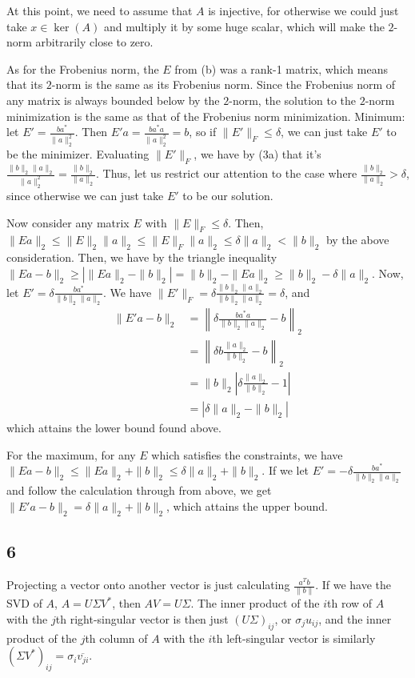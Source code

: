 \documentclass{article}
\newcommand{\conj}{\overline}
\begin{document}
At this point, we need to assume that $A$ is injective, for otherwise we could just take $x\in\ker(A)$ and multiply it by some huge scalar, which will make the $2$-norm arbitrarily close to zero. 

As for the Frobenius norm, the $E$ from (b) was a rank-1 matrix, which means that its $2$-norm is the same as its Frobenius norm. Since the Frobenius norm of any matrix is always bounded below by the $2$-norm, the solution to the $2$-norm minimization is the same as that of the Frobenius norm minimization.
Minimum: let $E'=\frac{ba^*}{\|a\|_2^2}$. Then $E'a=\frac{ba^*a}{\|a\|_2^2}=b$, so if $\|E'\|_F\leq\delta$, we can just take $E'$ to be the minimizer. Evaluating $\|E'\|_F$, we have by (3a) that it's $\frac{\|b\|_2\|a\|_2}{\|a\|_2^2}=\frac{\|b\|_2}{\|a\|_2}$. Thus, let us restrict our attention to the case where $\frac{\|b\|_2}{\|a\|_2}>\delta$, since otherwise we can just take $E'$ to be our solution.

Now consider any matrix $E$ with $\|E\|_F\leq\delta$. Then, $\|Ea\|_2\leq\|E\|_2\|a\|_2\leq\|E\|_F\|a\|_2\leq\delta\|a\|_2<\|b\|_2$ by the above consideration. Then, we have by the triangle inequality $\|Ea-b\|_2\geq\left|\|Ea\|_2-\|b\|_2\right|=\|b\|_2-\|Ea\|_2\geq\|b\|_2-\delta\|a\|_2$. Now, let $E'=\delta\frac{ba^*}{\|b\|_2\|a\|_2}$. We have $\|E'\|_F=\delta\frac{\|b\|_2\|a\|_2}{\|b\|_2\|a\|_2}=\delta$, and
\begin{align*}
    \|E'a-b\|_2&=\left\|\delta\frac{ba^*a}{\|b\|_2\|a\|_2}-b\right\|_2\\
              &=\left\|\delta b\frac{\|a\|_2}{\|b\|_2}-b\right\|_2\\
              &=\|b\|_2\left|\delta\frac{\|a\|_2}{\|b\|_2}-1\right|\\
              &=\left|\delta\|a\|_2-\|b\|_2\right|
\end{align*}
which attains the lower bound found above.

For the maximum, for any $E$ which satisfies the constraints, we have $\|Ea-b\|_2\leq\|Ea\|_2+\|b\|_2\leq\delta\|a\|_2+\|b\|_2$. If we let $E'=-\delta\frac{ba^*}{\|b\|_2\|a\|_2}$ and follow the calculation through from above, we get $\|E'a-b\|_2=\delta\|a\|_2+\|b\|_2$, which attains the upper bound.
\subsection*{6}
Projecting a vector onto another vector is just calculating $\frac{a^Tb}{\|b\|}$. If we have the SVD of $A$, $A=U\Sigma V^*$, then $AV=U\Sigma$. The inner product of the $i$th row of $A$ with the $j$th right-singular vector is then just $(U\Sigma)_{ij}$, or $\sigma_ju_{ij}$, and the inner product of the $j$th column of $A$ with the $i$th left-singular vector is similarly $(\Sigma V^*)_{ij}=\sigma_i \conj{v_{ji}}$. 
\end{document}
